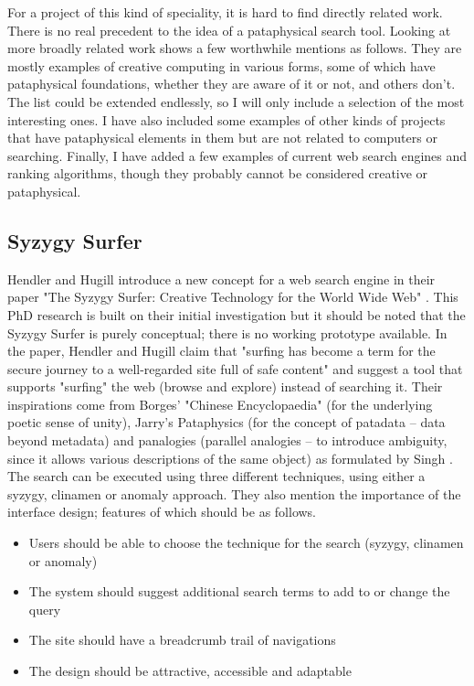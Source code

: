 For a project of this kind of speciality, it is hard to find directly related work. There is no real  precedent to the idea of a pataphysical search tool.
Looking at more broadly related work shows a few worthwhile mentions as follows. They are mostly examples of creative computing in various forms, some of which have pataphysical foundations, whether they are aware of it or not, and others don't. The list could be extended endlessly, so I will only include a selection of the most interesting ones. I have also included some examples of other kinds of projects that have pataphysical elements in them but are not related to computers or searching. Finally, I have added a few examples of current web search engines and ranking algorithms, though they probably cannot be considered creative or pataphysical.

\subsection{Syzygy Surfer}

Hendler and Hugill introduce a new concept for a web search engine in their paper "The Syzygy Surfer: Creative Technology for the World Wide Web" \citep{Hendler2011}. This PhD research is built on their initial investigation but it should be noted that the Syzygy Surfer is purely conceptual; there is no working prototype available. In the paper, Hendler and Hugill claim that "surfing has become a term for the secure journey to a well-regarded site full of safe content" and suggest a tool that supports "surfing" the web (browse and explore) instead of searching it. Their inspirations come from Borges' "Chinese Encyclopaedia" \citep{Borges1942} (for the underlying poetic sense of unity), Jarry's Pataphysics (for the concept of patadata – data beyond metadata) and  panalogies (parallel analogies – to introduce ambiguity, since it allows various descriptions of the same object) as formulated by Singh \citep{Singh2005}. The search can be executed using three different techniques, using either a syzygy, clinamen or anomaly approach. They also mention the importance of the interface design; features of which should be as follows.

\begin{itemize}
\item Users should be able to choose the technique for the search (syzygy, clinamen or anomaly)
\item The system should suggest additional search terms to add to or change the query
\item The site should have a breadcrumb trail of navigations
\item The design should be attractive, accessible and adaptable
\end{itemize}


